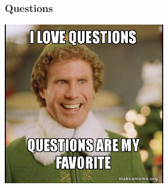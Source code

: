\documentclass[aspectratio=169]{beamer}
\begin{document}
\begin{frame}
  \frametitle{Questions}
  \begin{center}
    \includegraphics[width=7cm,keepaspectratio]{questions}
  \end{center}
\end{frame}
\end{document}
